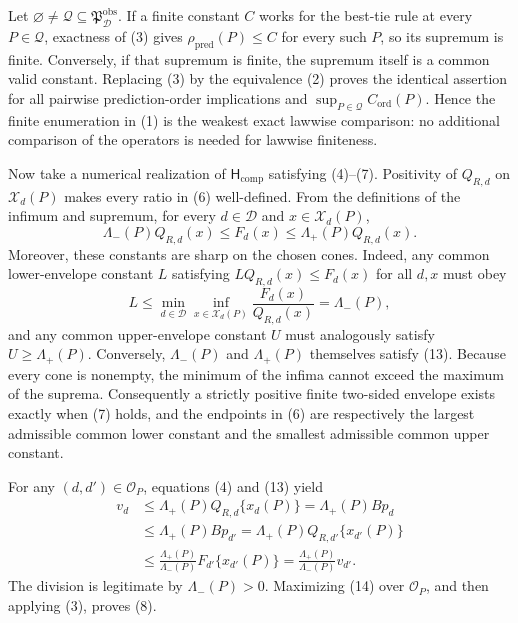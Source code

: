 Let \(\varnothing\ne\mathcal Q\subseteq\mathfrak P_{\mathcal D}^{\mathrm{obs}}\).  If a finite constant \(C\) works for the best-tie rule at every \(P\in\mathcal Q\), exactness of (3) gives \(\rho_{\mathrm{pred}}(P)\le C\) for every such \(P\), so its supremum is finite.  Conversely, if that supremum is finite, the supremum itself is a common valid constant.  Replacing (3) by the equivalence (2) proves the identical assertion for all pairwise prediction-order implications and \(\sup_{P\in\mathcal Q}C_{\mathrm{ord}}(P)\).  Hence the finite enumeration in (1) is the weakest exact lawwise comparison: no additional comparison of the operators is needed for lawwise finiteness.

Now take a numerical realization of \(\mathsf H_{\mathrm{comp}}\) satisfying (4)--(7).  Positivity of \(Q_{R,d}\) on \(\mathcal X_d(P)\) makes every ratio in (6) well-defined.  From the definitions of the infimum and supremum, for every \(d\in\mathcal D\) and \(x\in\mathcal X_d(P)\),
\[
 \Lambda_-(P)Q_{R,d}(x)
 \le F_d(x)
 \le\Lambda_+(P)Q_{R,d}(x).                                \tag{13}
\]
Moreover, these constants are sharp on the chosen cones.  Indeed, any common lower-envelope constant \(L\) satisfying \(LQ_{R,d}(x)\le F_d(x)\) for all \(d,x\) must obey
\[
 L\le\min_{d\in\mathcal D}\inf_{x\in\mathcal X_d(P)}
       \frac{F_d(x)}{Q_{R,d}(x)}=\Lambda_-(P),
\]
and any common upper-envelope constant \(U\) must analogously satisfy \(U\ge\Lambda_+(P)\).  Conversely, \(\Lambda_-(P)\) and \(\Lambda_+(P)\) themselves satisfy (13).  Because every cone is nonempty, the minimum of the infima cannot exceed the maximum of the suprema.  Consequently a strictly positive finite two-sided envelope exists exactly when (7) holds, and the endpoints in (6) are respectively the largest admissible common lower constant and the smallest admissible common upper constant.

For any \((d,d')\in\mathcal O_P\), equations (4) and (13) yield
\[
\begin{aligned}
 v_d
 &\le\Lambda_+(P)Q_{R,d}\{x_d(P)\}
   =\Lambda_+(P)Bp_d\\
 &\le\Lambda_+(P)Bp_{d'}
   =\Lambda_+(P)Q_{R,d'}\{x_{d'}(P)\}\\
 &\le\frac{\Lambda_+(P)}{\Lambda_-(P)}
       F_{d'}\{x_{d'}(P)\}
   =\frac{\Lambda_+(P)}{\Lambda_-(P)}v_{d'}.
\end{aligned}                                                \tag{14}
\]
The division is legitimate by \(\Lambda_-(P)>0\).  Maximizing (14) over \(\mathcal O_P\), and then applying (3), proves (8).

